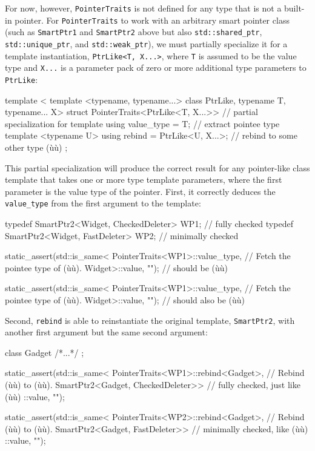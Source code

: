 For now, however, \lstinline!PointerTraits! is not defined for any type
that is not a built-in pointer. For \lstinline!PointerTraits! to work with
an arbitrary smart pointer class (such as \lstinline!SmartPtr1! and
\lstinline!SmartPtr2! above but also \lstinline!std::shared_ptr!,
\lstinline!std::unique_ptr!, and \lstinline!std::weak_ptr!), we must
partially specialize it for a template instantiation,
\lstinline!PtrLike<T,!~\lstinline!X...>!, where \lstinline!T! is assumed to be
the value type and \lstinline!X...! is a parameter pack of zero or more
additional type parameters to \lstinline!PtrLike!:

\begin{emcppslisting}[emcppsbatch=e40]
template <
    template <typename, typename...> class PtrLike,
    typename T, typename... X>
struct PointerTraits<PtrLike<T, X...>>  // partial specialization for template
{
    using value_type = T;               // extract pointee type
    template <typename U>
    using rebind = PtrLike<U, X...>;    // rebind to some other type (ù{}ù)
};
\end{emcppslisting}
    

\noindent This partial specialization will produce the correct result for any
pointer-like class template that takes one or more type template
parameters, where the first parameter is the value type of the pointer.
First, it correctly deduces the \lstinline!value_type! from the first
argument to the template:

\begin{emcppslisting}[emcppsbatch=e40]
typedef SmartPtr2<Widget, CheckedDeleter>  WP1;  // fully checked
typedef SmartPtr2<Widget, FastDeleter>     WP2;  // minimally checked

static_assert(std::is_same<
    PointerTraits<WP1>::value_type,  // Fetch the pointee type of (ù{}ù).
    Widget>::value, "");             // should be (ù{}ù)

static_assert(std::is_same<
    PointerTraits<WP1>::value_type,  // Fetch the pointee type of (ù{}ù).
    Widget>::value, "");             // should also be (ù{}ù)
\end{emcppslisting}
    

\noindent Second, \lstinline!rebind! is able to reinstantiate the original template,
\lstinline!SmartPtr2!, with another first argument but the same second
argument:

\begin{emcppslisting}[emcppsbatch=e40]
class Gadget { /*...*/ };

static_assert(std::is_same<
    PointerTraits<WP1>::rebind<Gadget>,  // Rebind (ù{}ù) to (ù{}ù).
    SmartPtr2<Gadget, CheckedDeleter>>   // fully checked, just like (ù{}ù)
::value, "");

static_assert(std::is_same<
    PointerTraits<WP2>::rebind<Gadget>,  // Rebind (ù{}ù) to (ù{}ù).
    SmartPtr2<Gadget, FastDeleter>>      // minimally checked, like (ù{}ù)
::value, "");
\end{emcppslisting}
    


